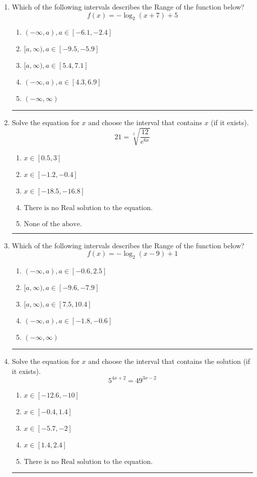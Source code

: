 \documentclass[14pt]{extbook}
\newcommand{\litem}[1]{\item#1\hspace*{-1cm}\rule{\textwidth}{0.4pt}}
\begin{document}
\begin{enumerate}
{\begin{enumerate}[label=\Alph*.]
\end{enumerate} }
\litem{
Which of the following intervals describes the Range of the function below?\[ f(x) = -\log_2{(x+7)}+5 \]\begin{enumerate}[label=\Alph*.]
\item \( (-\infty, a), a \in [-6.1, -2.4] \)
\item \( [a, \infty), a \in [-9.5, -5.9] \)
\item \( [a, \infty), a \in [5.4, 7.1] \)
\item \( (-\infty, a), a \in [4.3, 6.9] \)
\item \( (-\infty, \infty) \)

\end{enumerate} }
\litem{
 Solve the equation for $x$ and choose the interval that contains $x$ (if it exists).\[  21 = \sqrt[5]{\frac{12}{e^{6x}}} \]\begin{enumerate}[label=\Alph*.]
\item \( x \in [0.5, 3] \)
\item \( x \in [-1.2, -0.4] \)
\item \( x \in [-18.5, -16.8] \)
\item \( \text{There is no Real solution to the equation.} \)
\item \( \text{None of the above.} \)

\end{enumerate} }
\litem{
Which of the following intervals describes the Range of the function below?\[ f(x) = -\log_2{(x-9)}+1 \]\begin{enumerate}[label=\Alph*.]
\item \( (-\infty, a), a \in [-0.6, 2.5] \)
\item \( [a, \infty), a \in [-9.6, -7.9] \)
\item \( [a, \infty), a \in [7.5, 10.4] \)
\item \( (-\infty, a), a \in [-1.8, -0.6] \)
\item \( (-\infty, \infty) \)

\end{enumerate} }
\litem{
Solve the equation for $x$ and choose the interval that contains the solution (if it exists).\[ 5^{4x+2} = 49^{3x-2} \]\begin{enumerate}[label=\Alph*.]
\item \( x \in [-12.6, -10] \)
\item \( x \in [-0.4, 1.4] \)
\item \( x \in [-5.7, -2] \)
\item \( x \in [1.4, 2.4] \)
\item \( \text{There is no Real solution to the equation.} \)


\end{enumerate}}
\end{enumerate}
\end{document}
